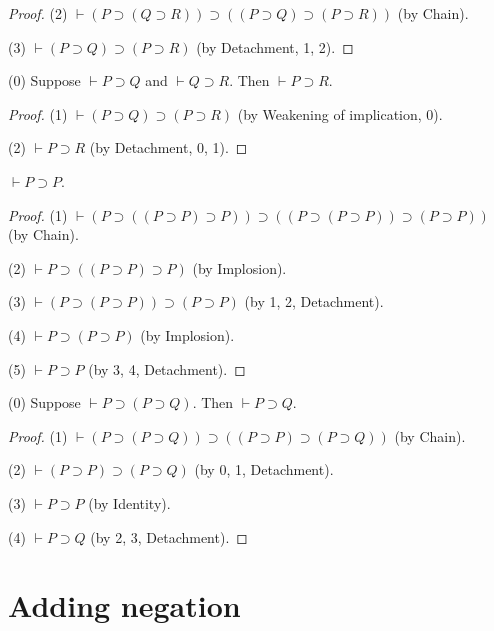 \documentclass{article}
\newcommand{\imp}{\supset}
\newcommand{\deducible}{\vdash}
\begin{document}
\begin{forthel}
\begin{proof}
    (2) $\deducible (P\imp (Q\imp R))\imp ((P\imp Q)\imp (P\imp R))$ (by Chain).

    (3) $\deducible (P\imp Q)\imp (P\imp R)$ (by Detachment, 1, 2).
\end{proof}

\begin{proposition}[Transitivity]
    (0) Suppose $\deducible P\imp Q$ and $\deducible Q\imp R$.
    Then $\deducible P\imp R$.
\end{proposition}
\begin{proof}
    (1) $\deducible (P\imp Q)\imp (P\imp R)$ (by Weakening of implication, 0).

    (2) $\deducible P\imp R$  (by Detachment, 0, 1).
\end{proof}

\begin{proposition}[Identity]
    $\deducible P\imp P$.
\end{proposition}
\begin{proof}
    (1) $\deducible (P\imp ((P\imp P)\imp P))\imp ((P\imp (P\imp P))\imp (P\imp P))$ (by Chain).

    (2) $\deducible P\imp ((P\imp P)\imp P)$ (by Implosion).

    (3) $\deducible (P\imp (P\imp P))\imp (P\imp P)$ (by 1, 2, Detachment).

    (4) $\deducible P\imp (P\imp P)$ (by Implosion).

    (5) $\deducible P\imp P$ (by 3, 4, Detachment).
\end{proof}

\begin{proposition}
    (0) Suppose $\deducible P\imp (P\imp Q)$.
    Then $\deducible P\imp Q$.
\end{proposition}
\begin{proof}
    (1) $\deducible (P\imp (P\imp Q))\imp ((P\imp P)\imp (P\imp Q))$ (by Chain).

    (2) $\deducible (P\imp P)\imp (P\imp Q)$ (by 0, 1, Detachment).

    (3) $\deducible P\imp P$  (by Identity).

    (4) $\deducible P\imp Q$  (by 2, 3, Detachment).
\end{proof}
\end{forthel}

\section{Adding negation}
\end{document}
